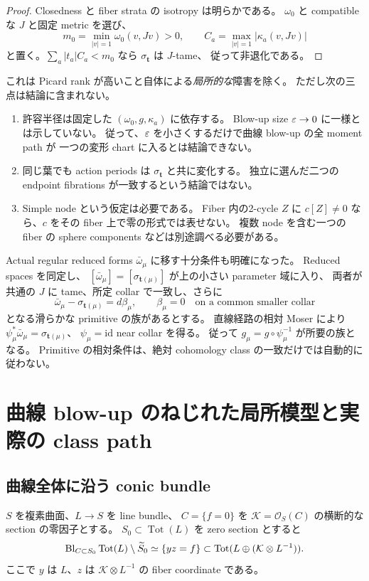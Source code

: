 \begin{proof}
Closedness と fiber strata の isotropy は明らかである。
$\omega_0$ と compatible な $J$ と固定 metric を選び、
\[
m_0=\min_{|v|=1}\omega_0(v,Jv)>0,\qquad
C_a=\max_{|v|=1}|\kappa_a(v,Jv)|
\]
と置く。$\sum_a|t_a|C_a<m_0$ なら $\sigma_{\mathbf t}$ は $J$-tame、
従って非退化である。
\end{proof}

これは Picard rank が高いこと自体による\emph{局所的な}障害を除く。
ただし次の三点は結論に含まれない。
\begin{enumerate}
\item 許容半径は固定した $(\omega_0,g,\kappa_a)$ に依存する。
Blow-up size $\varepsilon\to0$ に一様とは示していない。
従って、$\varepsilon$ を小さくするだけで曲線 blow-up の全 moment path が
一つの変形 chart に入るとは結論できない。
\item 同じ葉でも action periods は $\sigma_{\mathbf t}$ と共に変化する。
独立に選んだ二つの endpoint fibrations が一致するという結論ではない。
\item Simple node という仮定は必要である。
Fiber 内の2-cycle $Z$ に $c[Z]\ne0$ なら、$c$ をその fiber 上で零の形式では表せない。
複数 node を含む一つの fiber の sphere components などは別途調べる必要がある。
\end{enumerate}

Actual regular reduced forms $\bar\omega_\mu$ に移す十分条件も明確になった。
Reduced spaces を同定し、
$[\bar\omega_\mu]=[\sigma_{\mathbf t(\mu)}]$ が上の小さい parameter 域に入り、
両者が共通の $J$ に tame、所定 collar で一致し、さらに
\[
\bar\omega_\mu-\sigma_{\mathbf t(\mu)}=d\beta_\mu,\qquad
\beta_\mu=0\quad\text{on a common smaller collar}
\]
となる滑らかな primitive の族があるとする。
直線経路の相対 Moser により
$\psi_\mu^*\bar\omega_\mu=\sigma_{\mathbf t(\mu)}$、
$\psi_\mu=\mathrm{id}$ near collar を得る。
従って $g_\mu=g\circ\psi_\mu^{-1}$ が所要の族となる。
Primitive の相対条件は、絶対 cohomology class の一致だけでは自動的に従わない。

\section{曲線 blow-up のねじれた局所模型と実際の class path}\label{sec:twisted}

\subsection{曲線全体に沿う conic bundle}

\begin{proposition}\label{prop:conic}
$S$ を複素曲面、$L\to S$ を line bundle、
$C=\{f=0\}$ を $\mathcal K=\mathcal O_S(C)$ の横断的な section の零因子とする。
$S_0\subset\operatorname{Tot}(L)$ を zero section とすると
\begin{equation}\label{eq:conic}
\operatorname{Bl}_{C\subset S_0}\operatorname{Tot}(L)\setminus\widetilde S_0
\simeq
\{yz=f\}\subset\operatorname{Tot}(L\oplus(\mathcal K\otimes L^{-1})).
\end{equation}
ここで $y$ は $L$、$z$ は $\mathcal K\otimes L^{-1}$ の fiber coordinate である。
\end{proposition}

